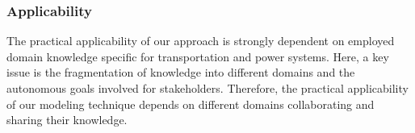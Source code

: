 \subsubsection*{Applicability}


The practical applicability of our approach is strongly dependent on employed domain knowledge specific for transportation and power systems. Here, a key issue is the fragmentation of knowledge into different domains and the autonomous goals involved for stakeholders. Therefore, the practical applicability of our modeling technique depends on different domains collaborating and sharing their knowledge.
